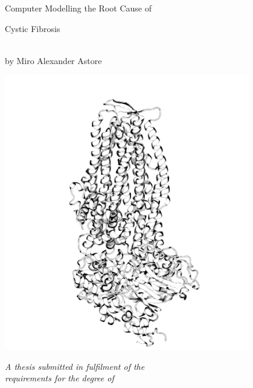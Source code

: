 
\begin{titlepage}

\begin{center}


\begin{LARGE}
Computer Modelling the Root Cause of  \\ 
\end{LARGE}
\vspace*{0.1in}
\begin{LARGE}
Cystic Fibrosis
\end{LARGE}
\begin{large} \\
\vspace{0.1in}
by Miro Alexander Astore

\vspace{-0.15in}
\includegraphics[width=0.8\textwidth]{figures/skeleton_bw.png}

\textit{A thesis submitted in fulfilment of the}\\
\textit{requirements for the degree of}


\end{large}
\end{center}
\end{titlepage}
